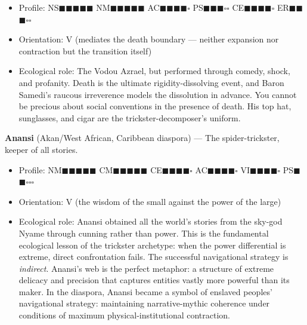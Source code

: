 \begin{itemize}[nosep,leftmargin=*]
  \item Profile: NS$\blacksquare$$\blacksquare$$\blacksquare$$\blacksquare$$\blacksquare$ NM$\blacksquare$$\blacksquare$$\blacksquare$$\blacksquare$$\blacksquare$ AC$\blacksquare$$\blacksquare$$\blacksquare$$\blacksquare$$\square$ PS$\blacksquare$$\blacksquare$$\blacksquare$$\square$$\square$ CE$\blacksquare$$\blacksquare$$\blacksquare$$\blacksquare$$\square$ ER$\blacksquare$$\blacksquare$$\blacksquare$$\square$$\square$
  \item Orientation: V (mediates the death boundary — neither expansion nor contraction but the transition itself)
  \item Ecological role: The Vodou Azrael, but performed through comedy, shock, and profanity. Death is the ultimate rigidity-dissolving event, and Baron Samedi's raucous irreverence models the dissolution in advance. You cannot be precious about social conventions in the presence of death. His top hat, sunglasses, and cigar are the trickster-decomposer's uniform.
\end{itemize}


\textbf{Anansi} (Akan/\allowbreak West African, Caribbean diaspora) — The spider-trickster, keeper of all stories.

\begin{itemize}[nosep,leftmargin=*]
  \item Profile: NM$\blacksquare$$\blacksquare$$\blacksquare$$\blacksquare$$\blacksquare$ CM$\blacksquare$$\blacksquare$$\blacksquare$$\blacksquare$$\blacksquare$ CE$\blacksquare$$\blacksquare$$\blacksquare$$\blacksquare$$\square$ AC$\blacksquare$$\blacksquare$$\blacksquare$$\blacksquare$$\square$ VI$\blacksquare$$\blacksquare$$\blacksquare$$\blacksquare$$\square$ PS$\blacksquare$$\blacksquare$$\square$$\square$$\square$
  \item Orientation: V (the wisdom of the small against the power of the large)
  \item Ecological role: Anansi obtained all the world's stories from the sky-god Nyame through cunning rather than power. This is the fundamental ecological lesson of the trickster archetype: when the power differential is extreme, direct confrontation fails. The successful navigational strategy is \textit{indirect}. Anansi's web is the perfect metaphor: a structure of extreme delicacy and precision that captures entities vastly more powerful than its maker. In the diaspora, Anansi became a symbol of enslaved peoples' navigational strategy: maintaining narrative-mythic coherence under conditions of maximum physical-institutional contraction.
\end{itemize}


